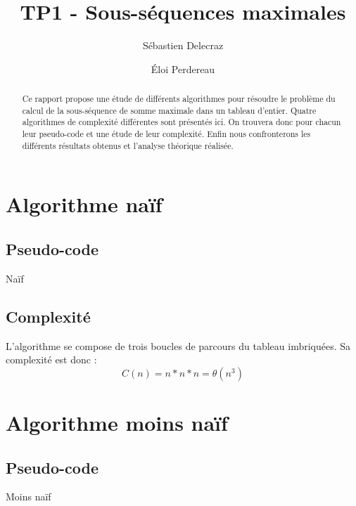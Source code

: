 \documentclass[11pt, a4paper]{article}
\title{TP1 - Sous-séquences maximales}
\author{Sébastien Delecraz \and \'Eloi Perdereau}
\begin{document}
\maketitle

\begin{abstract}
  Ce rapport propose une étude de différents algorithmes pour résoudre le
  problème du calcul de la sous-séquence de somme maximale dans un tableau
  d'entier. Quatre algorithmes de complexité différentes sont présentés ici.
  On trouvera donc pour chacun leur pseudo-code et une étude de leur
  complexité. Enfin nous confronterons les
  différents résultats obtenus et l'analyse théorique réalisée.
\end{abstract}

\section{Algorithme naïf}
\subsection{Pseudo-code}

\begin{algorithm}[H]
  \caption{Naïf}
\end{algorithm}
\subsection{Complexité}
L'algorithme se compose de trois boucles de parcours du tableau imbriquées. Sa
complexité est donc :
\[C(n) = n*n*n = \theta{(n^3)}\]

\section{Algorithme moins naïf}
\subsection{Pseudo-code}

\begin{algorithm}[H]
  \caption{Moins naïf}
\end{algorithm}
\end{document}
